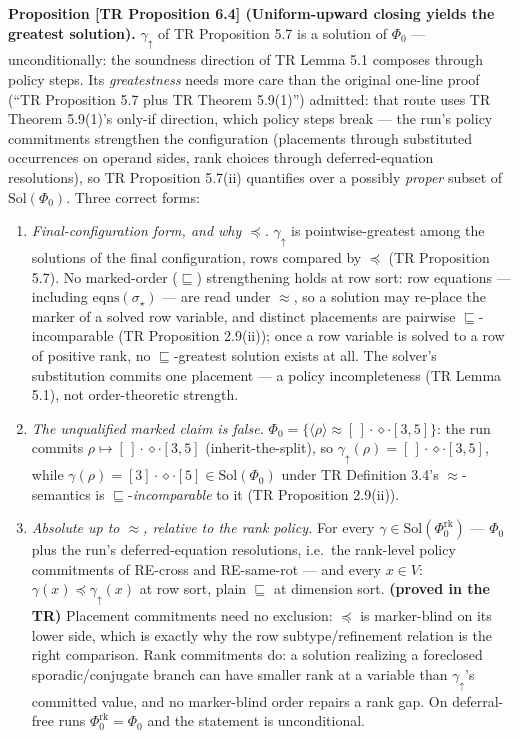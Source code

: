 \documentclass[
  10pt,
  letterpaper,
]{article}
\begin{document}
\textbf{Proposition {[}TR Proposition 6.4{]} (Uniform-upward closing
yields the greatest solution).} \(\gamma_\uparrow\) of TR Proposition
5.7 is a solution of \(\Phi_0\) --- unconditionally: the soundness
direction of TR Lemma 5.1 composes through policy steps. Its
\emph{greatestness} needs more care than the original one-line proof
(``TR Proposition 5.7 plus TR Theorem 5.9(1)'') admitted: that route
uses TR Theorem 5.9(1)'s only-if direction, which policy steps break ---
the run's policy commitments strengthen the configuration (placements
through substituted occurrences on operand sides, rank choices through
deferred-equation resolutions), so TR Proposition 5.7(ii) quantifies
over a possibly \emph{proper} subset of \(\mathrm{Sol}(\Phi_0)\). Three
correct forms:

\begin{enumerate}
\def\labelenumi{(\roman{enumi})}
\item
  \emph{Final-configuration form, and why \(\preceq\).}
  \(\gamma_\uparrow\) is pointwise-greatest among the solutions of the
  final configuration, rows compared by \(\preceq\) (TR Proposition
  5.7). No marked-order (\(\sqsubseteq\)) strengthening holds at row
  sort: row equations --- including \(\mathrm{eqns}(\sigma_\star)\) ---
  are read under \(\approx\), so a solution may re-place the marker of a
  solved row variable, and distinct placements are pairwise
  \(\sqsubseteq\)-incomparable (TR Proposition 2.9(ii)); once a row
  variable is solved to a row of positive rank, no
  \(\sqsubseteq\)-greatest solution exists at all. The solver's
  substitution commits one placement --- a policy incompleteness (TR
  Lemma 5.1), not order-theoretic strength.
\item
  \emph{The unqualified marked claim is false.}
  \(\Phi_0 = \{\langle\rho\rangle \approx [\,]\cdot\diamond\cdot[3,5]\}\):
  the run commits \(\rho \mapsto [\,]\cdot\diamond\cdot[3,5]\)
  (inherit-the-split), so
  \(\gamma_\uparrow(\rho) = [\,]\cdot\diamond\cdot[3,5]\), while
  \(\gamma(\rho) = [3]\cdot\diamond\cdot[5] \in \mathrm{Sol}(\Phi_0)\)
  under TR Definition 3.4's \(\approx\)-semantics is
  \(\sqsubseteq\)-\emph{incomparable} to it (TR Proposition 2.9(ii)).
\item
  \emph{Absolute up to \(\approx\), relative to the rank policy.} For
  every \(\gamma \in \mathrm{Sol}(\Phi_0^{\mathrm{rk}})\) --- \(\Phi_0\)
  plus the run's deferred-equation resolutions, i.e.~the rank-level
  policy commitments of RE-cross and RE-same-rot --- and every
  \(x \in V\): \(\gamma(x) \preceq \gamma_\uparrow(x)\) at row sort,
  plain \(\sqsubseteq\) at dimension sort. \textbf{(proved in the TR)}
  Placement commitments need no exclusion: \(\preceq\) is marker-blind
  on its lower side, which is exactly why the row subtype/refinement
  relation is the right comparison. Rank commitments do: a solution
  realizing a foreclosed sporadic/conjugate branch can have smaller rank
  at a variable than \(\gamma_\uparrow\)'s committed value, and no
  marker-blind order repairs a rank gap. On deferral-free runs
  \(\Phi_0^{\mathrm{rk}} = \Phi_0\) and the statement is unconditional.
\end{enumerate}
\end{document}
